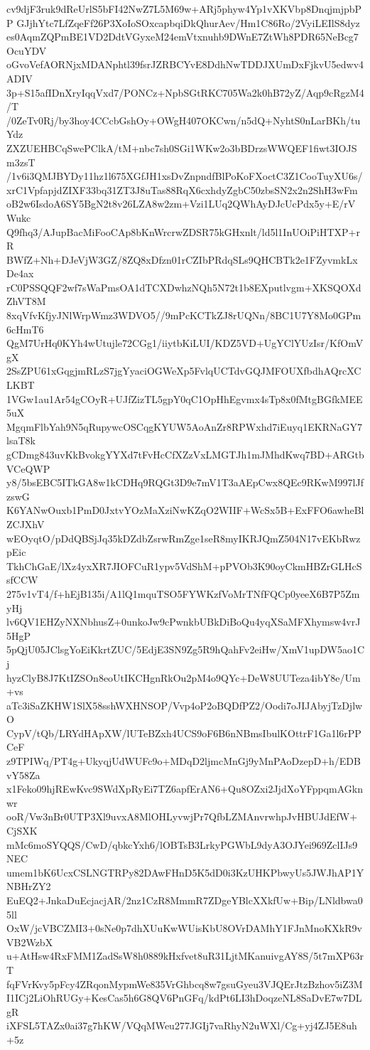 cv9djF3ruk9dReUrlS5bFI42NwZ7L5M69w+ARj5phyw4Yp1vXKVbp8DnqjmjpbPP
GJjhYtc7LfZqeFf26P3XoIoSOxcapbqiDkQhurAev/Hm1C86Ro/2VyiLEIlS8dyz
es0AqmZQPmBE1VD2DdtVGyxeM24emVtxnuhb9DWnE7ZtWh8PDR65NeBcg7OcuYDV
oGvoVefAORNjxMDANphtl39fsrJZRBCYvE8DdhNwTDDJXUmDxFjkvU5edwv4ADIV
3p+S15afIDnXryIqqVxd7/PONCz+NpbSGtRKC705Wa2k0hB72yZ/Aqp9cRgzM4/T
/0ZeTv0Rj/by3hoy4CCcbGshOy+OWgH407OKCwn/n5dQ+NyhtS0nLarBKh/tuYdz
ZXZUEHBCqSwePClkA/tM+nbc7sh0SGi1WKw2o3bBDrzsWWQEF1fiwt3IOJSm3zsT
/1v6i3QMJBYDy11hz1l675XGfJH1xsDvZnpndfBlPoKoFXoctC3Z1CooTuyXU6s/
xrC1VpfapjdZIXF33bq31ZT3J8uTas88RqX6cxhdyZgbC50zbsSN2x2n2ShH3wFm
oB2w6IsdoA6SY5BgN2t8v26LZA8w2zm+Vzi1LUq2QWhAyDJcUcPdx5y+E/rVWukc
Q9fhq3/AJupBacMiFooCAp8bKnWrcrwZDSR75kGHxnlt/ld5l1InUOiPiHTXP+rR
BWfZ+Nh+DJeVjW3GZ/8ZQ8xDfzn01rCZIbPRdqSLs9QHCBTk2e1FZyvmkLxDe4ax
rC0PSSQQF2wf7sWaPmsOA1dTCXDwhzNQh5N72t1b8EXputlvgm+XKSQOXdZhVT8M
8xqVfvKfjyJNlWrpWmz3WDVO5//9mPcKCTkZJ8rUQNn/8BC1U7Y8Mo0GPm6cHmT6
QgM7UrHq0KYh4wUtujle72CGg1/iiytbKiLUI/KDZ5VD+UgYClYUzIsr/KfOmVgX
2SsZPU61xGqgjmRLzS7jgYyaciOGWeXp5FvlqUCTdvGQJMFOUXfbdhAQrcXCLKBT
1VGw1au1Ar54gCOyR+UJfZizTL5gpY0qC1OpHhEgvmx4sTp8x0fMtgBGfkMEE5uX
MgqmFlbYah9N5qRupywcOSCqgKYUW5AoAnZr8RPWxhd7iEuyq1EKRNaGY7lsaT8k
gCDmg843uvKkBvokgYYXd7tFvHcCfXZzVxLMGTJh1mJMhdKwq7BD+ARGtbVCeQWP
y8/5bsEBC5ITkGA8w1kCDHq9RQGt3D9e7mV1T3aAEpCwx8QEc9RKwM997lJfzswG
K6YANwOuxb1PmD0JxtvYOzMaXziNwKZqO2WIIF+WcSx5B+ExFFO6awheBlZCJXhV
wEOyqtO/pDdQBSjJq35kDZdbZsrwRmZge1seR8myIKRJQmZ504N17vEKbRwzpEic
TkhChGaE/lXz4yxXR7JIOFCuR1ypv5VdShM+pPVOb3K90oyCkmHBZrGLHcSsfCCW
275v1vT4/f+hEjB135i/A1lQ1mquTSO5FYWKzfVoMrTNfFQCp0yeeX6B7P5ZmyHj
lv6QV1EHZyNXNbhusZ+0unkoJw9cPwnkbUBkDiBoQu4yqXSaMFXhymsw4vrJ5HgP
5pQjU05JClsgYoEiKkrtZUC/5EdjE3SN9Zg5R9hQahFv2eiHw/XmV1upDW5ao1Cj
hyzClyB8J7KtIZSOn8eoUtIKCHgnRkOu2pM4o9QYc+DeW8UUTeza4ibY8e/Um+vs
aTc3iSaZKHW1SlX58sshWXHNSOP/Vvp4oP2oBQDfPZ2/Oodi7oJIJAbyjTzDjlwO
CypV/tQb/LRYdHApXW/lUTeBZxh4UCS9oF6B6nNBmsIbulKOttrF1Ga1l6rPPCeF
z9TPIWq/PT4g+UkyqjUdWUFc9o+MDqD2ljmcMnGj9yMnPAoDzepD+h/EDBvY58Za
x1Feko09hjREwKvc9SWdXpRyEi7TZ6apfErAN6+Qu8OZxi2JjdXoYFppqmAGknwr
ooR/Vw3nBr0UTP3Xl9uvxA8MlOHLyvwjPr7QfbLZMAnvrwhpJvHBUJdEfW+CjSXK
mMc6moSYQQS/CwD/qbkcYxh6/lOBTsB3LrkyPGWbL9dyA3OJYei969ZclIJs9NEC
umem1bK6UcxCSLNGTRPy82DAwFHnD5K5dD0i3KzUHKPbwyUs5JWJhAP1YNBHrZY2
EuEQ2+JnkaDuEcjacjAR/2nz1CzR8MmmR7ZDgeYBlcXXkfUw+Bip/LNldbwa05ll
OxW/jcVBCZMI3+0sNe0p7dhXUuKwWUisKbU8OVrDAMhY1FJnMnoKXkR9vVB2WzbX
u+AtHsw4RxFMM1ZadSsW8h0889kHxfvet8uR31LjtMKanuivgAY8S/5t7mXP63rT
fqFVrKvy5pFcy4ZRqonMypmWe835VrGhbcq8w7gsuGyeu3VJQErJtzBzhov5iZ3M
I1ICj2LiOhRUGy+KesCas5h6G8QV6PnGFq/kdPt6LI3hDoqzeNL8SaDvE7w7DLgR
iXFSL5TAZx0ai37g7hKW/VQqMWeu277JGIj7vaRhyN2uWXl/Cg+yj4ZJ5E8uh+5z
